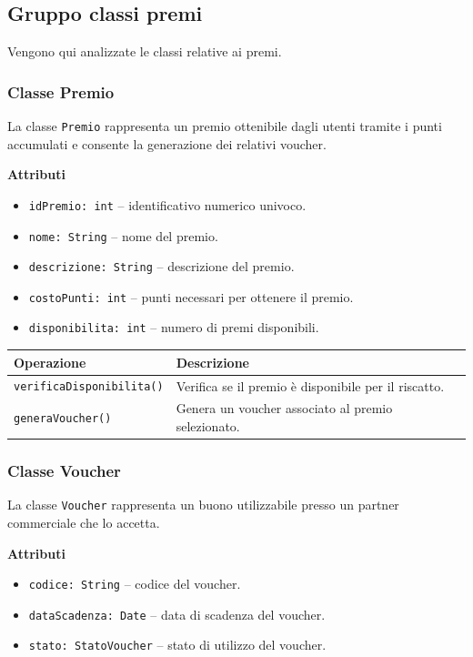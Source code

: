 \documentclass[12pt,a4paper]{article}
\begin{document}
\subsection{Gruppo classi premi} 
Vengono qui analizzate le classi relative ai premi.

\subsubsection{Classe Premio}
La classe \texttt{Premio} rappresenta un premio ottenibile dagli utenti 
tramite i punti accumulati e consente la generazione dei relativi voucher.

\textbf{Attributi}
\begin{itemize}
    \item \texttt{idPremio: int} -- identificativo numerico univoco.
    \item \texttt{nome: String} -- nome del premio.
    \item \texttt{descrizione: String} -- descrizione del premio.
    \item \texttt{costoPunti: int} -- punti necessari per ottenere il premio.
    \item \texttt{disponibilita: int} -- numero di premi disponibili.
\end{itemize}

\begin{table}[H]
\centering
\begin{tabularx}{\textwidth}{@{}lX@{}}
\toprule
\textbf{Operazione} & \textbf{Descrizione} \\ \midrule
\texttt{verificaDisponibilita()} & Verifica se il premio è disponibile per il riscatto. \\
\texttt{generaVoucher()} & Genera un voucher associato al premio selezionato. \\
\end{tabularx}
\end{table}

\subsubsection{Classe Voucher}
La classe \texttt{Voucher} rappresenta un buono utilizzabile presso un partner commerciale che lo accetta.

\textbf{Attributi}
\begin{itemize}
    \item \texttt{codice: String} -- codice del voucher.
    \item \texttt{dataScadenza: Date} -- data di scadenza del voucher.
    \item \texttt{stato: StatoVoucher} -- stato di utilizzo del voucher.
\end{itemize}
\end{document}
